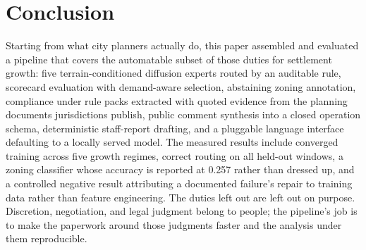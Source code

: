\documentclass[11pt]{article}
\begin{document}
\section{Conclusion}
Starting from what city planners actually do, this paper assembled and
evaluated a pipeline that covers the automatable subset of those
duties for settlement growth: five terrain-conditioned diffusion
experts routed by an auditable rule, scorecard evaluation with
demand-aware selection, abstaining zoning annotation, compliance under
rule packs extracted with quoted evidence from the planning documents
jurisdictions publish, public comment synthesis into a
closed operation schema, deterministic staff-report drafting, and a
pluggable language interface defaulting to a locally served model. The
measured results include converged training across five growth
regimes, correct routing on all held-out windows, a zoning classifier
whose accuracy is reported at 0.257 rather than dressed up, and a
controlled negative result attributing a documented failure's repair
to training data rather than feature engineering. The duties left out
are left out on purpose. Discretion, negotiation, and legal judgment
belong to people; the pipeline's job is to make the paperwork around
those judgments faster and the analysis under them reproducible.
\end{document}
